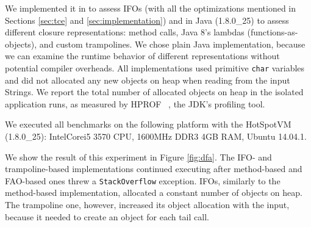 We implemented it in \name to assess
IFOs (with all the optimizations mentioned in Sections \ref{sec:tce} and
\ref{sec:implementation}) and in Java (1.8.0\_25) to assess different closure representations: method
calls, Java 8's lambdas (functions-as-objects), and custom
trampolines. We chose plain Java implementation, because we can examine the
runtime behavior of different representations without potential
compiler overheads. All implementations used primitive \lstinline{char} variables and did not allocated any
new objects on heap when reading from the input Strings.
We report the total number of allocated objects on heap in the isolated application
runs, as measured by HPROF~ \cite{hprof}, the JDK's profiling tool.

\noindent We executed all benchmarks on the following platform with
the HotSpot\texttrademark VM (1.8.0\_25):
Intel\textregistered Core\texttrademark i5 3570 CPU, 1600MHz DDR3 4GB
RAM, Ubuntu 14.04.1.

We show the result of this experiment in Figure \ref{fig:dfa}. The IFO-
and trampoline-based implementations continued executing after method-based and FAO-based
ones threw a \lstinline{StackOverflow} exception. IFOs, similarly
to the method-based implementation, allocated a constant number of
objects on heap. The trampoline one, however, increased its object
allocation with the input, because it needed to create an object for 
each tail call.

